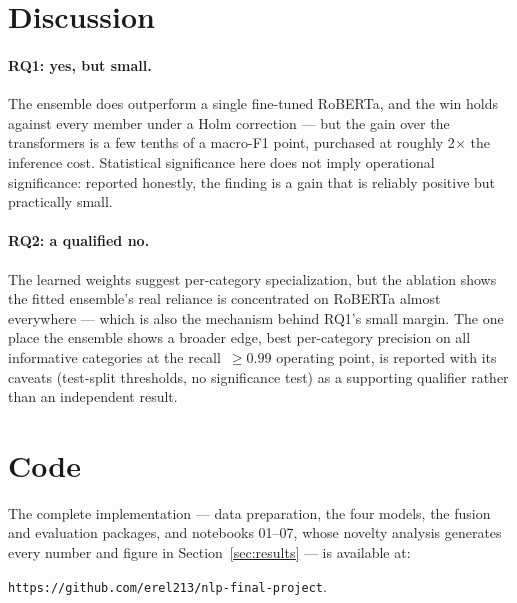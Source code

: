 \documentclass{article}
\begin{document}
\section{Discussion}
\label{sec:discussion}

\paragraph{RQ1: yes, but small.} The ensemble does outperform a single
fine-tuned RoBERTa, and the win holds against every member under a Holm
correction --- but the gain over the transformers is a few tenths of a
macro-F1 point, purchased at roughly 2$\times$ the inference cost.
Statistical significance here does not imply operational significance:
reported honestly, the finding is a gain that is reliably positive but
practically small.

\paragraph{RQ2: a qualified no.} The learned weights suggest
per-category specialization, but the ablation shows the fitted
ensemble's real reliance is concentrated on RoBERTa almost everywhere
--- which is also the mechanism behind RQ1's small margin. The one
place the ensemble shows a broader edge, best per-category precision on
all informative categories at the recall~$\geq 0.99$ operating point,
is reported with its caveats (test-split thresholds, no significance
test) as a supporting qualifier rather than an independent result.

\section{Code}

The complete implementation --- data preparation, the four models, the
fusion and evaluation packages, and notebooks 01--07, whose novelty
analysis generates every number and figure in
Section~\ref{sec:results} --- is available at:

\texttt{https://github.com/erel213/nlp-final-project}.

\clearpage


\end{document}
